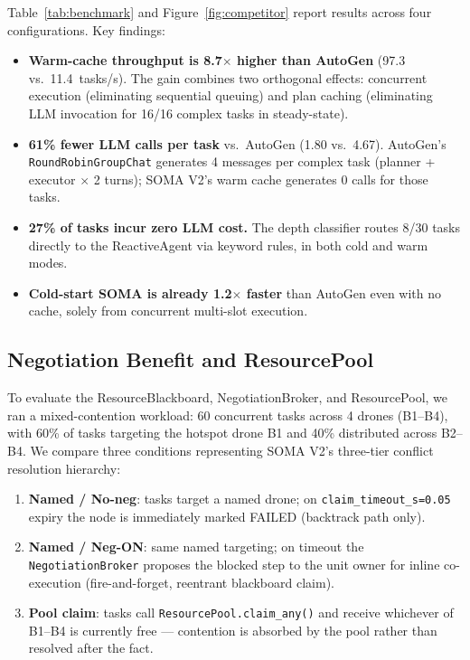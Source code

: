 \documentclass[conference]{IEEEtran}
\begin{document}
Table~\ref{tab:benchmark} and Figure~\ref{fig:competitor} report results across four
configurations. Key findings:

\begin{itemize}
  \item \textbf{Warm-cache throughput is 8.7$\times$ higher than AutoGen} (97.3 vs.\
        11.4~tasks/s). The gain combines two orthogonal effects: concurrent execution
        (eliminating sequential queuing) and plan caching (eliminating LLM invocation for
        16/16 complex tasks in steady-state).
  \item \textbf{61\% fewer LLM calls per task} vs.\ AutoGen (1.80 vs.\ 4.67). AutoGen's
        \texttt{RoundRobinGroupChat} generates 4 messages per complex task (planner +
        executor $\times$ 2 turns); SOMA V2's warm cache generates 0 calls for those tasks.
  \item \textbf{27\% of tasks incur zero LLM cost.} The depth classifier routes 8/30
        tasks directly to the ReactiveAgent via keyword rules, in both cold and warm modes.
  \item \textbf{Cold-start SOMA is already 1.2$\times$ faster} than AutoGen even with
        no cache, solely from concurrent multi-slot execution.
\end{itemize}

\subsection{Negotiation Benefit and ResourcePool}
\label{sec:negotiation}

To evaluate the ResourceBlackboard, NegotiationBroker, and ResourcePool, we ran a
mixed-contention workload: 60 concurrent tasks across 4 drones (B1--B4), with 60\%
of tasks targeting the hotspot drone B1 and 40\% distributed across B2--B4. We compare
three conditions representing SOMA V2's three-tier conflict resolution hierarchy:

\begin{enumerate}
  \item \textbf{Named / No-neg}: tasks target a named drone; on \texttt{claim\_timeout\_s=0.05}
        expiry the node is immediately marked FAILED (backtrack path only).
  \item \textbf{Named / Neg-ON}: same named targeting; on timeout the
        \texttt{NegotiationBroker} proposes the blocked step to the unit owner for
        inline co-execution (fire-and-forget, reentrant blackboard claim).
  \item \textbf{Pool claim}: tasks call \texttt{ResourcePool.claim\_any()} and receive
        whichever of B1--B4 is currently free --- contention is absorbed by the pool
        rather than resolved after the fact.
\end{enumerate}
\end{document}
